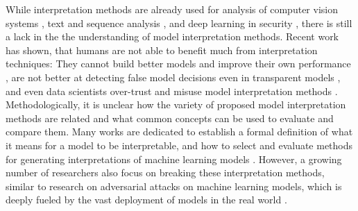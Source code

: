 While interpretation methods are already used for analysis of computer vision systems \cite{bach2015pixel, simonyan2013deep, zeiler2014visualizing}, text and sequence analysis \cite{ancona2017towards, arras2017relevant}, and deep learning in security \cite{evaluating_explanations_security}, there is still a lack in the the understanding of model interpretation methods. 
Recent work has shown, that humans are not able to benefit much from interpretation techniques: They cannot build better models and improve their own performance \cite{hase2020evaluating}, are not better at detecting false model decisions even in transparent models \cite{poursabzi2018manipulating}, and even data scientists over-trust and misuse model interpretation methods \cite{kaur2020interpreting}. 
Methodologically, it is unclear how the variety of proposed model interpretation methods are related and what common concepts can be used to evaluate and compare them. Many works are dedicated to establish a formal definition of what it means for a model to be interpretable, and how to select and evaluate methods for generating interpretations of machine learning models \cite{murdoch2019definitions, lipton2018mythos}. However, a growing number of researchers also focus on breaking these interpretation methods, similar to research on adversarial attacks on machine learning models, which is deeply fueled by the vast deployment of models in the real world \cite{fooling_nn_interpreters,ghorbani2019interpretation,dimanov2020you,dombrowski2019explanations,advlime_aies20, le2020remote, zhang2020interpretable, kuppa2020black, anders2020fairwashing, lakkaraju2020fool, kindermans2017reliability}.



